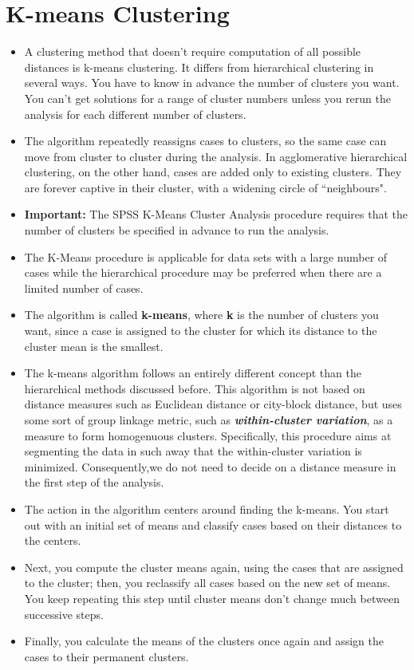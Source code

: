 \documentclass[a4paper,12pt]{article}
\begin{document}
\section{K-means Clustering}
\begin{itemize}
\item A clustering method that doesn't require computation of all possible distances is k-means clustering. It differs from hierarchical clustering in several ways. You have to know in advance the number of clusters you want. You can't get solutions for a range of cluster numbers unless you rerun the analysis for each different number of clusters.

\item The algorithm repeatedly reassigns cases to clusters, so the same case can move from cluster to cluster during the analysis. In agglomerative hierarchical clustering, on the other hand, cases are added only to existing clusters. They are forever captive in their cluster, with a widening circle of ``neighbours".

\item \textbf{Important:} The SPSS K-Means Cluster Analysis procedure requires that the number of clusters be specified in advance to run the analysis. 
\item  The K-Means procedure is applicable for data sets with a large number of cases while the hierarchical procedure may be preferred when there are a limited number of cases.


	\item The algorithm is called \textbf{k-means}, where \textbf{k} is the number of clusters you want, since a case is assigned to the cluster for which its distance to the cluster mean is the smallest.
	
	\item The k-means algorithm follows an entirely different concept than the hierarchical methods
	discussed before. This algorithm is not based on distance measures such as
	Euclidean distance or city-block distance, but uses some sort of group linkage metric, such as  \textbf{\textit{within-cluster variation}}, as a measure to form homogenuous clusters. Specifically, this procedure aims at segmenting
	the data in such away that the within-cluster variation is minimized. Consequently,we
	do not need to decide on a distance measure in the first step of the analysis.
	
	\item The action in the algorithm centers around finding the k-means. You start out with an initial set of means and classify cases based on their distances to the centers.
	
	\item Next, you compute the cluster means again, using the cases that are assigned to the cluster; then, you reclassify all cases based on the new set of means. You keep repeating this step until cluster means don't change much between successive steps.
	
	\item Finally, you calculate the means of the clusters once again and assign the cases to their permanent clusters.
\end{itemize}
\end{document}
